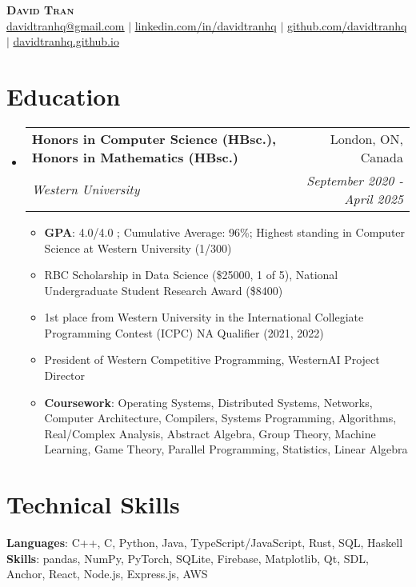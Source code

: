 \documentclass[letterpaper,10pt]{article}
\makeatletter
\newcommand{\resumeItem}[1]{
  \item\small{
    {#1 \vspace{-2pt}}
  }
}
\newcommand{\resumeSubheading}[4]{
  \vspace{-2pt}\item
    \begin{tabular*}{0.97\textwidth}[t]{l@{\extracolsep{\fill}}r}
      \textbf{#1} & #2 \\
      \textit{\small#3} & \textit{\small #4} \\
    \end{tabular*}\vspace{-7pt}
}
\newcommand{\resumeSubHeadingListStart}{\begin{itemize}[leftmargin=0.15in, label={}]}
\newcommand{\resumeSubHeadingListEnd}{\end{itemize}}
\newcommand{\resumeItemListStart}{\begin{itemize}}
\newcommand{\resumeItemListEnd}{\end{itemize}\vspace{-5pt}}
\makeatother
\begin{document}

\begin{center}
    \textbf{\Huge \scshape David Tran} \\ \vspace{1pt}
    \href{mailto:davidtranhq@gmail.com}{\underline{davidtranhq@gmail.com}} $|$
    \href{https://www.linkedin.com/in/davidtranhq}{\underline{linkedin.com/in/davidtranhq}} $|$
    \href{https://github.com/davidtranhq}{\underline{github.com/davidtranhq}} $|$
    \href{https://davidtranhq.github.io}{\underline{davidtranhq.github.io}}
\end{center}


\section{Education}
\resumeSubHeadingListStart
  \resumeSubheading
    {Honors in Computer Science (HBsc.), Honors in Mathematics (HBsc.)}{London, ON, Canada}
    {Western University}{September 2020 - April 2025}
    \resumeItemListStart
      \resumeItem{\textbf{GPA}: 4.0/4.0 ; Cumulative Average: 96\%; Highest standing in Computer Science at Western University (1/300)}
      \resumeItem{RBC Scholarship in Data Science (\$25000, 1 of 5), National Undergraduate Student Research Award (\$8400)}
      \resumeItem{1st place  from Western University in the International Collegiate Programming Contest (ICPC) NA Qualifier (2021, 2022)}
      \resumeItem{President of Western Competitive Programming, WesternAI Project Director }
      \resumeItem{\textbf{Coursework}{: Operating Systems, Distributed Systems, Networks, Computer Architecture, Compilers, Systems Programming, Algorithms, Real/Complex Analysis, Abstract Algebra, Group Theory, Machine Learning, Game Theory, Parallel Programming, Statistics, Linear Algebra }}

      \resumeItemListEnd
    \resumeSubHeadingListEnd

    \section{Technical Skills}
    \begin{itemize}[leftmargin=0.15in, label={}]
       \small{\item{
        \textbf{Languages}{: C++, C, Python, Java, TypeScript/JavaScript, Rust, SQL, Haskell} \\
        \textbf{Skills}{: pandas, NumPy, PyTorch, SQLite, Firebase, Matplotlib, Qt, SDL, Anchor, React, Node.js, Express.js, AWS }}} \\
    \end{itemize}
%
\end{document}
